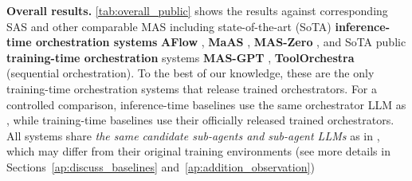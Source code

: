 \textbf{Overall results.} \cref{tab:overall_public} shows the results against corresponding SAS and other comparable MAS including state-of-the-art (SoTA) \textbf{inference-time orchestration systems} \textbf{AFlow} \citep{zhang2024aflowautomatingagenticworkflow}, \textbf{MaAS} \citep{zhang2025multiagentarchitecturesearchagentic}, \textbf{MAS-Zero} \citep{Ke2025MASZero}, and SoTA public \textbf{training-time orchestration} systems \textbf{MAS-GPT} \citep{ye2025masgpttrainingllmsbuild}, \textbf{ToolOrchestra} \citep{su2025toolorchestraelevatingintelligenceefficient} {(sequential orchestration)}. To the best of our knowledge, these are the only training-time orchestration systems that release trained orchestrators. For a controlled comparison, inference-time baselines use the same orchestrator LLM as \ourframework, while training-time baselines use their officially released trained orchestrators. All systems share \textit{the same candidate sub-agents and sub-agent LLMs} as in \ourframework, {which may differ from their original training environments} (see more details in Sections~\ref{ap:discuss_baselines} and~\ref{ap:addition_observation})



